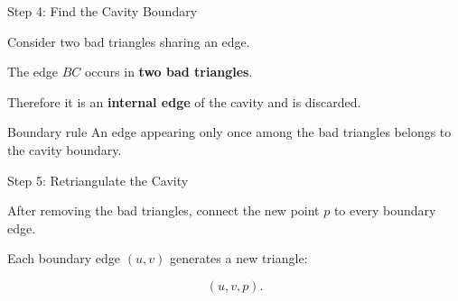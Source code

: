 \documentclass[aspectratio=169]{beamer}
\begin{document}
\begin{frame}{Step 4: Find the Cavity Boundary}

Consider two bad triangles sharing an edge.

\begin{center}
\end{center}

The edge $BC$ occurs in \textbf{two bad triangles}.

Therefore it is an \textbf{internal edge} of the cavity and is discarded.

\begin{block}{Boundary rule}
An edge appearing only once among the bad triangles belongs
to the cavity boundary.
\end{block}

\end{frame}

\begin{frame}{Step 5: Retriangulate the Cavity}

After removing the bad triangles, connect the new point $p$
to every boundary edge.

\begin{center}
\end{center}

Each boundary edge $(u,v)$ generates a new triangle:

\[
(u,v,p).
\]

\end{frame}
\end{document}
